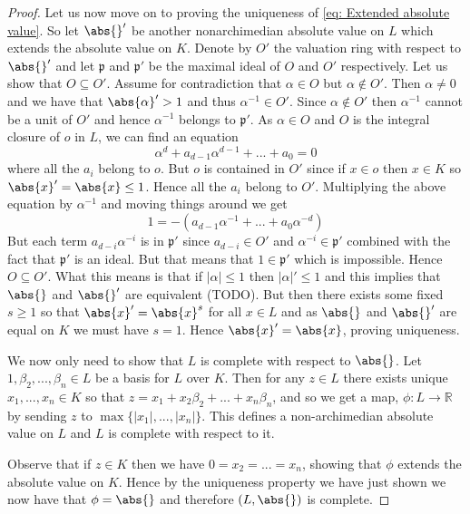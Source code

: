 \documentclass{article}
\newcommand{\mfrak}[1]{\mathfrak{#1}}
\newcommand{\mbb}[1]{\mathbb{#1}}
\begin{document}
\begin{proof}
    Let us now move on to proving the uniqueness of \cref{eq: Extended absolute value}. So let $\abs{}'$ be another nonarchimedian absolute value on $L$ which extends the absolute value on $K$. Denote by $O'$ the valuation ring with respect to $\abs{}'$ and let $\mfrak p$ and $\mfrak p'$ be the maximal ideal of $O$ and $O'$ respectively. Let us show that $O \subseteq O'$. Assume for contradiction that $\alpha \in O$ but $\alpha \notin O'$. Then $\alpha \neq 0$ and we have that $\abs{\alpha}' > 1$ and thus $\alpha^{-1} \in O'$. Since $\alpha \notin O'$ then $\alpha^{-1}$ cannot be a unit of $O'$ and hence $\alpha^{-1}$ belongs to $\mfrak p'$. As $\alpha \in O$ and $O$ is the integral closure of $o$ in $L$, we can find an equation
    $$\alpha^d + a_{d-1}\alpha^{d-1} + ... + a_0 = 0$$
    where all the $a_i$ belong to $o$. But $o$ is contained in $O'$ since if $x \in o$ then $x \in K$ so $\abs{x}' = \abs{x} \leq 1$. Hence all the $a_i$ belong to $O'$. Multiplying the above equation by $\alpha^{-1}$ and moving things around we get $$1 = -(a_{d-1}\alpha^{-1} + ... + a_0\alpha^{-d})$$
    But each term $a_{d-i} \alpha^{-i}$ is in $\mfrak p'$ since $a_{d-i} \in O'$ and $\alpha^{-i} \in \mfrak p'$ combined with the fact that $\mfrak p'$ is an ideal. But that means that $1 \in \mfrak p'$ which is impossible. Hence $O \subseteq O'$. What this means is that if $|\alpha| \leq 1$ then $|\alpha|' \leq 1$ and this implies that $\abs{}$ and $\abs{}'$ are equivalent (TODO). But then there exists some fixed $s \geq 1$ so that $\abs{x}' = \abs{x}^s$ for all $x \in L$ and as $\abs{}$ and $\abs{}'$ are equal on $K$ we must have $s = 1$. Hence $\abs{x}' = \abs{x}$, proving uniqueness.

    We now only need to show that $L$ is complete with respect to $\abs{}$. Let $1, \beta_2, ..., \beta_{n} \in L$ be a basis for $L$ over $K$. Then for any $z \in L$ there exists unique $x_1, ..., x_n \in K$ so that $z = x_1 + x_2 \beta_2 + ... + x_{n}\beta_{n}$, and so we get a map, $\phi : L \to \mbb R$ by sending $z$ to $\max \{|x_1|, ...,|x_n|\}$. This defines a non-archimedian absolute value on $L$ and $L$ is complete with respect to it. 
    
    
    
    Observe that if $z \in K$ then we have $0 = x_2 = ... = x_n$, showing that $\phi$ extends the absolute value on $K$. Hence by the uniqueness property we have just shown we now have that $\phi = \abs{}$ and therefore $(L, \abs{})$ is complete. 
\end{proof}
\end{document}
